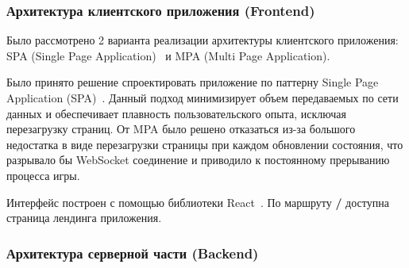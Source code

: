 \newpage

\subsubsection{Архитектура клиентского приложения (Frontend)}

Было рассмотрено 2 варианта реализации архитектуры клиентского приложения: SPA (Single Page Application)~\cite{mesbah-spa} и MPA (Multi Page Application).

Было принято решение спроектировать приложение по паттерну Single Page Application (SPA)~\cite{mesbah-spa}. Данный подход минимизирует объем передаваемых по сети данных и обеспечивает плавность пользовательского опыта, исключая перезагрузку страниц. От MPA было решено отказаться из-за большого недостатка в виде перезагрузки страницы при каждом обновлении состояния, что разрывало бы WebSocket соединение и приводило к постоянному прерыванию процесса игры.

Интерфейс построен с помощью библиотеки React~\cite{react-arch}. По маршруту \textbf{/} доступна страница лендинга приложения.

\subsubsection{Архитектура серверной части (Backend)}

